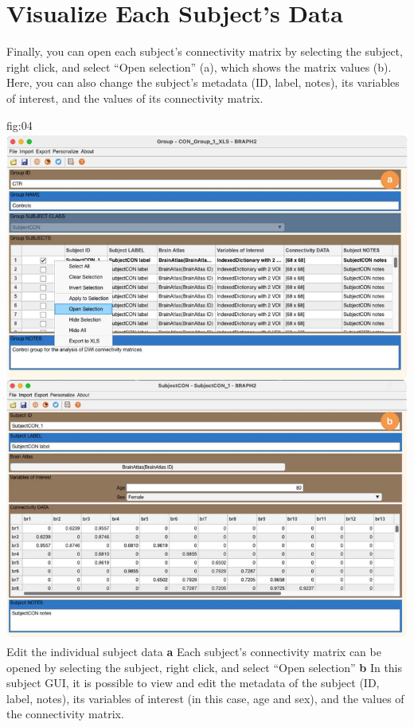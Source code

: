 \documentclass[justified]{tufte-handout}
\begin{document}

\section{Visualize Each Subject's Data}

Finally, you can open each subject's connectivity matrix by selecting the subject, right click, and select ``Open selection'' (a), which shows the matrix values (b). Here, you can also change the subject's metadata (ID, label, notes), its variables of interest, and the values of its connectivity matrix.

	{fig:04}
	{\includegraphics{fig04.jpg}
	}
	{Edit the individual subject data}
	{
	{\bf a}  Each subject's connectivity matrix can be opened by selecting the subject, right click, and select ``Open selection''
	{\bf b} In this subject GUI, it is possible to view and edit the metadata of the subject (ID, label, notes), its variables of interest (in this case, age and sex), and the values of the connectivity matrix. 
	}
\end{document}
